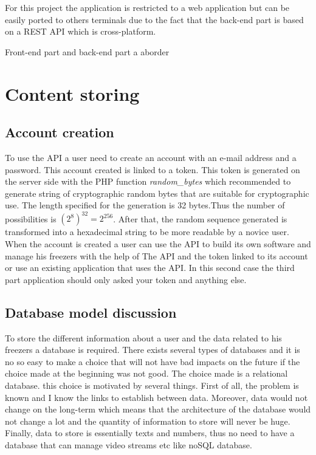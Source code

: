 For this project the application is restricted to a web application but can be easily ported to others terminals due to the fact that the back-end part is based on a REST API which is cross-platform.

Front-end part and back-end part a aborder
\section{Content storing}
\subsection{Account creation}
To use the API a user need to create an account with an e-mail address and a password. This account created is linked to a token. This token is generated on the server side with the PHP function \textit{random\_bytes} which recommended to generate string of cryptographic random bytes that are suitable for cryptographic use. The length  specified for the generation is 32 bytes.Thus the number of possibilities is $(2^8)^32 = 2^256$. After that, the random sequence generated is transformed into a hexadecimal string to be more readable by a novice user.\\

When the account is created a user can use the API to build its own software and manage his freezers with the help of The API and the token linked to its account or use an existing application that uses the API. In this second case the third part application should only asked your token and anything else.\\

\subsection{Database model discussion}
To store the different information about a user and the data related to his freezers a database is required. There exists several types of databases and it is no so easy to make a choice that will not have bad impacts on the future if the choice made at the beginning was not good. The choice made is a relational database. this choice is motivated by several things. First of all, the problem is known and I know the links to establish between data. Moreover, data would not change on the long-term which means that the architecture of the database would not change a lot and the quantity of information to store will never be huge. Finally, data to store is essentially texts and numbers, thus no need to have a database that can manage video streams etc like noSQL database.\\

